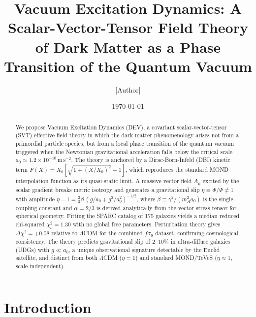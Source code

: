 \documentclass[aps,prd,twocolumn,showpacs,superscriptaddress]{revtex4-2}
\newcommand{\aO}{a_0}
\newcommand{\LCDM}{$\Lambda$CDM}
\begin{document}
\title{Vacuum Excitation Dynamics: A Scalar-Vector-Tensor Field Theory
       of Dark Matter as a Phase Transition of the Quantum Vacuum}

\author{[Author]}
\affiliation{[Institution]}

\date{\today}

\begin{abstract}
We propose Vacuum Excitation Dynamics (DEV), a covariant
scalar-vector-tensor (SVT) effective field theory in which the dark
matter phenomenology arises not from a primordial particle species,
but from a local phase transition of the quantum vacuum triggered when
the Newtonian gravitational acceleration falls below the critical scale
$\aO \simeq 1.2\times10^{-10}$\,m\,s$^{-2}$.
The theory is anchored by a Dirac-Born-Infeld (DBI) kinetic term
$F(X) = X_0[\sqrt{1+(X/X_0)^2}-1]$,
which reproduces the standard MOND interpolation function as its
quasi-static limit.
A massive vector field $A_\mu$ excited by the scalar gradient breaks
metric isotropy and generates a gravitational slip
$\eta \equiv \Phi/\Psi \neq 1$ with amplitude
$\eta - 1 = \frac{2}{3}\beta\,(g/\aO+g^2/\aO^2)^{-1/2}$,
where $\beta \equiv \gamma^2/(m_A^2 \aO)$ is the single coupling constant
and $\alpha = 2/3$ is derived analytically from the vector stress tensor
for spherical geometry.
Fitting the SPARC catalog of 175 galaxies yields a median reduced
chi-squared $\chi^2_\nu = 1.30$ with no global free parameters.
Perturbation theory gives $\Delta\chi^2 = +0.08$ relative to \LCDM{}
for the combined $f\sigma_8$ dataset, confirming
cosmological consistency.
The theory predicts gravitational slip of $2$--$10\%$ in
ultra-diffuse galaxies (UDGs) with $g \ll \aO$, a unique
observational signature detectable by the Euclid satellite,
and distinct from both \LCDM{} ($\eta=1$) and
standard MOND/TeVeS ($\eta\approx 1$, scale-independent).
\end{abstract}


\maketitle

\section{Introduction}
\label{sec:intro}
\end{document}
